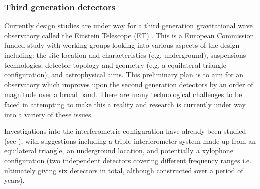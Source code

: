 \documentclass{article}
\begin{document}
\subsubsection{Third generation detectors}
Currently design studies are under way for a third generation gravitational wave
observatory called the Einstein Telescope (ET) \cite{ETweb}. This is a European
Commission funded study with working groups looking into various aspects of the
design including: the site location and characteristics (e.g. underground),
suspensions technologies; detector topology and geometry (e.g. a equilateral
triangle configuration); and astrophysical aims. This preliminary plan is to
aim for an observatory which improves upon the second generation detectors by
an order of magnitude over a broad band. There are many technological
challenges to be faced in attempting to make this a reality and research is
currently under way into a variety of these issues.

Investigations into the interferometric configuration have already been studied
(see \cite{Freise:2008, Hild:2008, Hild:2010}), with suggestions including a triple
interferometer system made up from an equilateral triangle, an underground
location, and potentially a xylophone configuration (two independent detectors
covering different frequency ranges i.e. ultimately giving six detectors in 
total, although constructed over a period of years). 



\end{document}
